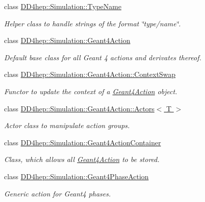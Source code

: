\begin{DoxyCompactItemize}
class \hyperlink{class_d_d4hep_1_1_simulation_1_1_type_name}{DD4hep::Simulation::TypeName}
\begin{DoxyCompactList}\small\item\em Helper class to handle strings of the format \char`\"{}type/name\char`\"{}. \item\end{DoxyCompactList}\item 
class \hyperlink{class_d_d4hep_1_1_simulation_1_1_geant4_action}{DD4hep::Simulation::Geant4Action}
\begin{DoxyCompactList}\small\item\em Default base class for all Geant 4 actions and derivates thereof. \item\end{DoxyCompactList}\item 
class \hyperlink{class_d_d4hep_1_1_simulation_1_1_geant4_action_1_1_context_swap}{DD4hep::Simulation::Geant4Action::ContextSwap}
\begin{DoxyCompactList}\small\item\em Functor to update the context of a \hyperlink{class_d_d4hep_1_1_simulation_1_1_geant4_action}{Geant4Action} object. \item\end{DoxyCompactList}\item 
class \hyperlink{class_d_d4hep_1_1_simulation_1_1_geant4_action_1_1_actors}{DD4hep::Simulation::Geant4Action::Actors$<$ T $>$}
\begin{DoxyCompactList}\small\item\em Actor class to manipulate action groups. \item\end{DoxyCompactList}\item 
class \hyperlink{class_d_d4hep_1_1_simulation_1_1_geant4_action_container}{DD4hep::Simulation::Geant4ActionContainer}
\begin{DoxyCompactList}\small\item\em Class, which allows all \hyperlink{class_d_d4hep_1_1_simulation_1_1_geant4_action}{Geant4Action} to be stored. \item\end{DoxyCompactList}\item 
class \hyperlink{class_d_d4hep_1_1_simulation_1_1_geant4_phase_action}{DD4hep::Simulation::Geant4PhaseAction}
\begin{DoxyCompactList}\small\item\em Generic action for Geant4 phases. \item\end{DoxyCompactList}\item 

\end{DoxyCompactItemize}
